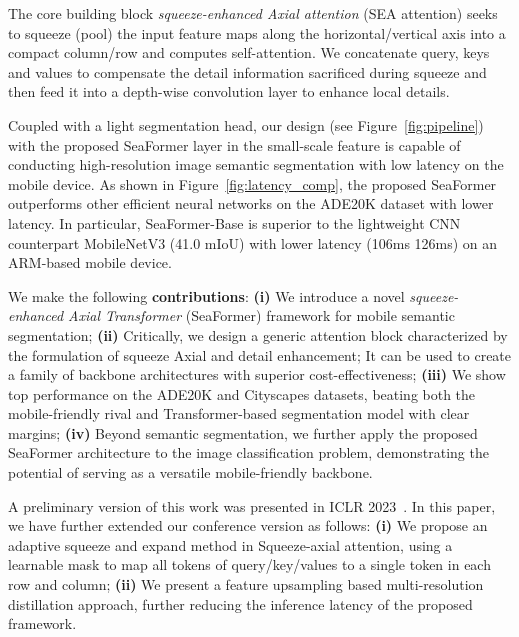 The core building block \textit{squeeze-enhanced Axial attention} (SEA attention) seeks to squeeze (pool) the input feature maps along the horizontal/vertical axis into a compact column/row and computes self-attention.
We concatenate query, keys and values to compensate the detail information sacrificed during squeeze and then feed it into a depth-wise convolution layer to enhance local details.

Coupled with a light segmentation head, our design (see Figure~\ref{fig:pipeline}) with the proposed SeaFormer layer in the small-scale feature is capable of conducting high-resolution image semantic segmentation with low latency on the mobile device.
As shown in Figure~\ref{fig:latency_comp}, the proposed SeaFormer outperforms other efficient neural networks on the ADE20K dataset with lower latency. 
In particular, SeaFormer-Base is superior to the lightweight CNN counterpart MobileNetV3 (41.0  mIoU) with lower latency (106ms \vs 126ms) on an ARM-based mobile device.

We make the following \textbf{contributions}:
\textbf{(i)}
We introduce a novel {\em squeeze-enhanced Axial Transformer} (SeaFormer) framework for mobile semantic segmentation;
\textbf{(ii)}
Critically, we design a generic attention block characterized by the formulation of squeeze Axial and detail enhancement;
It can be used to create a family of backbone architectures with superior cost-effectiveness;
\textbf{(iii)}
We show top performance on the ADE20K and Cityscapes datasets, beating both the mobile-friendly rival and Transformer-based segmentation model with clear margins;
\textbf{(iv)}
Beyond semantic segmentation, we further apply the proposed SeaFormer architecture to 
the image classification problem, demonstrating the potential of serving as a versatile mobile-friendly backbone.


A preliminary version of this work was presented in ICLR 2023~\cite{wan2023seaformer}.
In this paper, we have further extended our conference version as follows:
{\bf (i)} 
We propose an adaptive squeeze and expand method in Squeeze-axial attention, using a learnable mask to map all tokens of query/key/values to a single token in each row and column;
{\bf (ii)} 
We present a feature upsampling based multi-resolution distillation approach, further reducing the inference latency of the proposed framework.